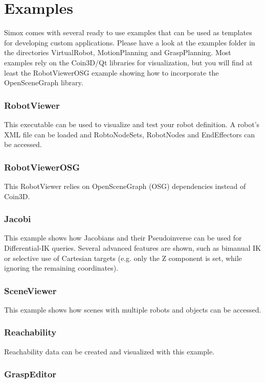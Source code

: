 \documentclass{book}
\begin{document}
\chapter{Examples}
Simox comes with several ready to use examples that can be used as templates for developing custom applications. Please have a look at the examples folder in the directories VirtualRobot, MotionPlanning and GraspPlanning. Most examples rely on the Coin3D/Qt libraries for visualization, but you will find at least the RobotViewerOSG example showing how to incorporate the OpenSceneGraph library. 

\subsection*{RobotViewer}

This executable can be used to visualize and test your robot definition. A robot's XML file can be loaded and RobtoNodeSets, RobotNodes and EndEffectors can be accessed.
\subsection*{RobotViewerOSG}

This RobotViewer relies on OpenSceneGraph (OSG) dependencies instead of Coin3D.
\subsection*{Jacobi}

This example shows how Jacobians and their Pseudoinverse can be used for Differential-IK queries. Several advanced features are shown, such as bimanual IK or selective use of Cartesian targets (e.g. only the Z component is set, while ignoring the remaining coordinates).
\subsection*{SceneViewer}

This example shows how scenes with multiple robots and objects can be accessed.
\subsection*{Reachability}

Reachability data can be created and visualized with this example.
\subsection*{GraspEditor}
\end{document}
